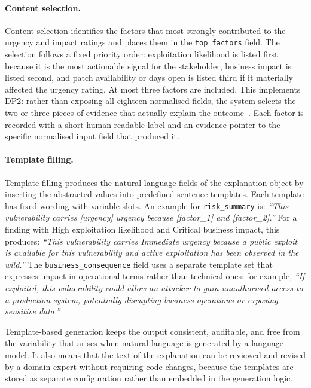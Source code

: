 \paragraph{Content selection.} Content selection identifies the factors that most strongly contributed to the urgency and impact ratings and places them in the \texttt{top\_factors} field. The selection follows a fixed priority order: exploitation likelihood is listed first because it is the most actionable signal for the stakeholder, business impact is listed second, and patch availability or days open is listed third if it materially affected the urgency rating. At most three factors are included. This implements DP2: rather than exposing all eighteen normalised fields, the system selects the two or three pieces of evidence that actually explain the outcome~\cite{miller2019explanation}. Each factor is recorded with a short human-readable label and an evidence pointer to the specific normalised input field that produced it.

\paragraph{Template filling.} Template filling produces the natural language fields of the explanation object by inserting the abstracted values into predefined sentence templates. Each template has fixed wording with variable slots. An example for \texttt{risk\_summary} is: \textit{``This vulnerability carries [urgency] urgency because [factor\_1] and [factor\_2].''} For a finding with High exploitation likelihood and Critical business impact, this produces: \textit{``This vulnerability 
carries Immediate urgency because a public exploit is available for 
this vulnerability and active exploitation has been observed in the 
wild.''} The \texttt{business\_consequence} field uses a separate template set that expresses impact in operational terms rather than technical ones: for example, \textit{``If exploited, this vulnerability could allow an attacker to gain unauthorised access to a production system, potentially disrupting business operations or exposing sensitive data.''}

Template-based generation keeps the output consistent, auditable, and free from the variability that arises when natural language is generated by a language model. It also means that the text of the explanation can be reviewed and revised by a domain expert without requiring code changes, because the templates are stored as separate configuration rather than embedded in the generation logic.

